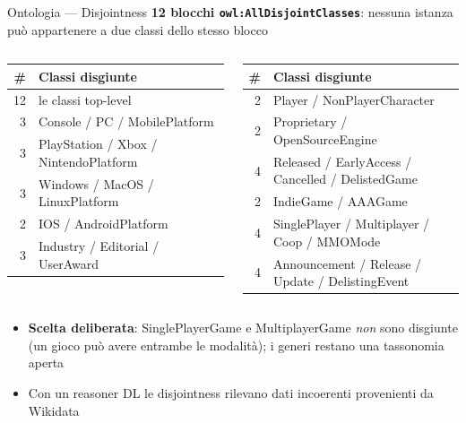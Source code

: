 \documentclass[aspectratio=169,11pt]{beamer}
\begin{document}
\begin{frame}{Ontologia --- Disjointness}
  \textbf{12 blocchi \texttt{owl:AllDisjointClasses}}: nessuna istanza pu\`o appartenere
  a due classi dello stesso blocco
  \vspace{4pt}

  \scriptsize
  \begin{columns}[T]
    \begin{tabular}{@{}r l@{}}
      \toprule
      \textbf{\#} & \textbf{Classi disgiunte} \\
      \midrule
      12 & le classi top-level \\
      3  & Console / PC / MobilePlatform \\
      3  & PlayStation / Xbox / NintendoPlatform \\
      3  & Windows / MacOS / LinuxPlatform \\
      2  & IOS / AndroidPlatform \\
      3  & Industry / Editorial / UserAward \\
      \bottomrule
    \end{tabular}

    \begin{tabular}{@{}r l@{}}
      \toprule
      \textbf{\#} & \textbf{Classi disgiunte} \\
      \midrule
      2 & Player / NonPlayerCharacter \\
      2 & Proprietary / OpenSourceEngine \\
      4 & Released / EarlyAccess / Cancelled / DelistedGame \\
      2 & IndieGame / AAAGame \\
      4 & SinglePlayer / Multiplayer / Coop / MMOMode \\
      4 & Announcement / Release / Update / DelistingEvent \\
      \bottomrule
    \end{tabular}
  \end{columns}

  \vspace{6pt}

  \small
  \begin{itemize}
    \item \textbf{Scelta deliberata}: SinglePlayerGame e MultiplayerGame \emph{non} sono disgiunte
      (un gioco pu\`o avere entrambe le modalit\`a); i generi restano una tassonomia aperta
    \item Con un reasoner DL le disjointness rilevano dati incoerenti provenienti da Wikidata
  \end{itemize}
\end{frame}
\end{document}
